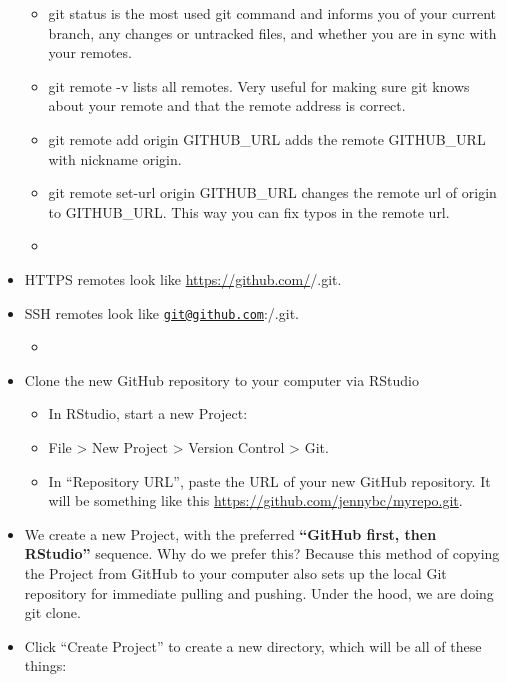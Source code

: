 \documentclass[
]{article}
\providecommand{\tightlist}{%
  \setlength{\itemsep}{0pt}\setlength{\parskip}{0pt}}
\begin{document}
\begin{itemize}
  \begin{itemize}
  \tightlist
  \item
    git status is the most used git command and informs you of your
    current branch, any changes or untracked files, and whether you
    are in sync with your remotes.
  \item
    git remote -v lists all remotes. Very useful for making sure git
    knows about your remote and that the remote address is correct.
  \item
    git remote add origin GITHUB\_URL adds the remote GITHUB\_URL with
    nickname origin.
  \item
    git remote set-url origin GITHUB\_URL changes the remote url of
    origin to GITHUB\_URL. This way you can fix typos in the remote
    url.
  \item
  \end{itemize}
\item
  HTTPS remotes look like \url{https://github.com/}/.git.
\item
  SSH remotes look like
  \href{mailto:git@github.com}{\nolinkurl{git@github.com}}:/.git.

  \begin{itemize}
  \tightlist
  \item
  \end{itemize}
\item
  Clone the new GitHub repository to your computer via RStudio

  \begin{itemize}
  \tightlist
  \item
    In RStudio, start a new Project:
  \item
    File \textgreater{} New Project \textgreater{} Version Control \textgreater{} Git.
  \item
    In ``Repository URL'', paste the URL of your new GitHub
    repository. It will be something like this
    \url{https://github.com/jennybc/myrepo.git}.
  \end{itemize}
\item
  We create a new Project, with the preferred \textbf{``GitHub first, then
  RStudio''} sequence. Why do we prefer this? Because this method of
  copying the Project from GitHub to your computer also sets up the
  local Git repository for immediate pulling and pushing. Under the
  hood, we are doing git clone.
\item
  Click ``Create Project'' to create a new directory, which will be all
  of these things:


\end{itemize}
\end{document}
